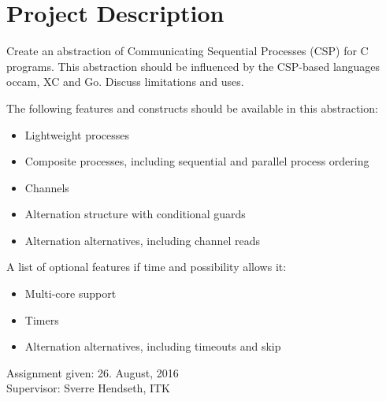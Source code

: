 \setcounter{page}{0}
\newpage
{}
\section*{Project Description}
\label{sec:project_description}

Create an abstraction of Communicating Sequential Processes (CSP) for C programs. This abstraction should be influenced by the CSP\hyp{}based languages occam, XC and Go. Discuss limitations and uses. 

The following features and constructs should be available in this abstraction:

\begin{itemize}[leftmargin=*,topsep=0em,itemsep=-1em,partopsep=0.5em,parsep=1em]
    \item Lightweight processes
    \item Composite processes, including sequential and parallel process ordering
    \item Channels
    \item Alternation structure with conditional guards
    \item Alternation alternatives, including channel reads
\end{itemize}

A list of optional features if time and possibility allows it:

\begin{itemize}[leftmargin=*,topsep=0em,itemsep=-1em,partopsep=0.5em,parsep=1em]
    \item Multi\hyp{}core support
    \item Timers
    \item Alternation alternatives, including timeouts and skip
\end{itemize}

\begin{flushleft}
Assignment given: 26. August, 2016\\
Supervisor: Sverre Hendseth, ITK
\end{flushleft}


\afterpage{\blankpage}
